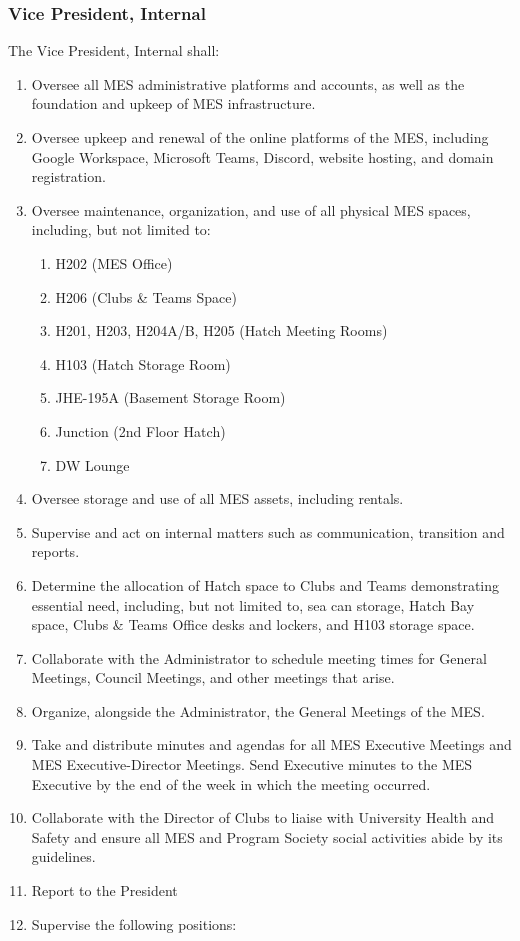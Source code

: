 \subsubsection{Vice President,
 Internal}
\label{vice-president-internal}
The Vice President, Internal shall:

\begin{enumerate}
 \item
  Oversee all MES administrative platforms and accounts, as well as the foundation and upkeep of MES infrastructure.
 \item
  Oversee upkeep and renewal of the online platforms of the MES, including Google Workspace, Microsoft Teams, Discord, website hosting, and domain registration.
 \item
  Oversee maintenance, organization, and use of all physical MES spaces, including, but not limited to:

  \begin{enumerate}
   \item
    H202 (MES Office)
   \item
    H206 (Clubs \& Teams Space)
   \item
    H201, H203, H204A/B, H205 (Hatch Meeting Rooms)
   \item
    H103 (Hatch Storage Room)
   \item
    JHE-195A (Basement Storage Room)
   \item
    Junction (2nd Floor Hatch)
   \item
    DW Lounge
  \end{enumerate}
 \item
  Oversee storage and use of all MES assets, including rentals.
 \item
  Supervise and act on internal matters such as communication, transition and reports.
 \item
  Determine the allocation of Hatch space to Clubs and Teams demonstrating essential need, including, but not limited to, sea can storage, Hatch Bay space, Clubs \& Teams Office desks and lockers, and H103 storage space.
 \item
  Collaborate with the Administrator to schedule meeting times for General Meetings, Council Meetings, and other meetings that arise.
 \item
  Organize, alongside the Administrator, the General Meetings of the MES.
 \item
  Take and distribute minutes and agendas for all MES Executive Meetings and MES Executive-Director Meetings. Send Executive minutes to the MES Executive by the end of the week in which the meeting occurred.
 \item
  Collaborate with the Director of Clubs to liaise with University Health and Safety and ensure all MES and Program Society social activities abide by its guidelines.
 \item
  Report to the President
 \item
  Supervise the following positions:


\end{enumerate}
